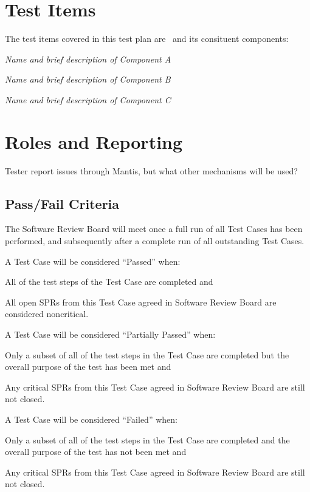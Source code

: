 \documentclass[CUx,lsstdraft,STP]{lsstdoc}
\begin{document}
\section{Test Items}

The test items covered in this test plan are \product \ and its consituent components:

\begin{itemize_single}
\item {\it Name and brief description of Component A}
\item {\it Name and brief description of Component B}
\item {\it Name and brief description of Component C}
\end{itemize_single}

\section{Roles and Reporting}

Tester report issues through Mantis, but what other mechanisms will be used?

\subsection{Pass/Fail Criteria}

The Software Review Board will meet once a full run of all Test Cases has been performed, and subsequently after a complete run of all outstanding Test Cases.

A Test Case will be considered ``Passed'' when:
\begin{itemize_single}
\item All of the test steps of the Test Case are completed and
\item All open SPRs from this Test Case agreed in Software Review Board are considered noncritical.
\end{itemize_single}

A Test Case will be considered ``Partially Passed'' when:
\begin{itemize_single}
\item Only a subset of all of the test steps in the Test Case are completed but the overall purpose of the test has been met and
\item Any critical SPRs from this Test Case agreed in Software Review Board are still not closed.
\end{itemize_single}

A Test Case will be considered ``Failed'' when:
\begin{itemize_single}
\item Only a subset of all of the test steps in the Test Case are completed and the overall purpose of the test has not been met and
\item Any critical SPRs from this Test Case agreed in Software Review Board are still not closed.
\end{itemize_single}
\end{document}
